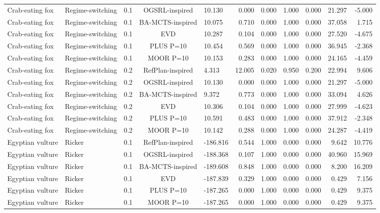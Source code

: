 \documentclass[10pt]{article}
\begin{document}
\begin{landscape}
\begin{center}
\begin{longtable}{@{}lllclrrrrrr@{}}
Crab-eating fox & Regime-switching & 0.1 & OGSRL-inspired & 10.130 & 0.000 & 0.000 & 1.000 & 0.000 & 21.297 & -5.000 \\
Crab-eating fox & Regime-switching & 0.1 & BA-MCTS-inspired & 10.075 & 0.710 & 0.000 & 1.000 & 0.000 & 37.058 & 1.715 \\
Crab-eating fox & Regime-switching & 0.1 & EVD & 10.287 & 0.104 & 0.000 & 1.000 & 0.000 & 27.520 & -4.675 \\
Crab-eating fox & Regime-switching & 0.1 & PLUS P=10 & 10.454 & 0.569 & 0.000 & 1.000 & 0.000 & 36.945 & -2.368 \\
Crab-eating fox & Regime-switching & 0.1 & MOOR P=10 & 10.153 & 0.283 & 0.000 & 1.000 & 0.000 & 24.165 & -4.459 \\
Crab-eating fox & Regime-switching & 0.2 & RefPlan-inspired & 4.313 & 12.005 & 0.020 & 0.950 & 0.200 & 22.994 & 9.606 \\
Crab-eating fox & Regime-switching & 0.2 & OGSRL-inspired & 10.130 & 0.000 & 0.000 & 1.000 & 0.000 & 21.297 & -5.000 \\
Crab-eating fox & Regime-switching & 0.2 & BA-MCTS-inspired & 9.372 & 0.773 & 0.000 & 1.000 & 0.000 & 33.094 & 4.626 \\
Crab-eating fox & Regime-switching & 0.2 & EVD & 10.306 & 0.104 & 0.000 & 1.000 & 0.000 & 27.999 & -4.623 \\
Crab-eating fox & Regime-switching & 0.2 & PLUS P=10 & 10.591 & 0.483 & 0.000 & 1.000 & 0.000 & 37.912 & -2.348 \\
Crab-eating fox & Regime-switching & 0.2 & MOOR P=10 & 10.142 & 0.288 & 0.000 & 1.000 & 0.000 & 24.287 & -4.419 \\
Egyptian vulture & Ricker & 0.1 & RefPlan-inspired & -186.816 & 0.544 & 1.000 & 0.000 & 0.000 & 9.642 & 10.776 \\
Egyptian vulture & Ricker & 0.1 & OGSRL-inspired & -188.368 & 0.107 & 1.000 & 0.000 & 0.000 & 40.960 & 15.969 \\
Egyptian vulture & Ricker & 0.1 & BA-MCTS-inspired & -189.608 & 0.848 & 1.000 & 0.000 & 0.000 & 8.200 & 16.209 \\
Egyptian vulture & Ricker & 0.1 & EVD & -187.839 & 0.329 & 1.000 & 0.000 & 0.000 & 0.429 & 7.156 \\
Egyptian vulture & Ricker & 0.1 & PLUS P=10 & -187.265 & 0.000 & 1.000 & 0.000 & 0.000 & 0.429 & 9.375 \\
Egyptian vulture & Ricker & 0.1 & MOOR P=10 & -187.265 & 0.000 & 1.000 & 0.000 & 0.000 & 0.429 & 9.375 \\

\end{longtable}
\end{center}
\end{landscape}
\end{document}
